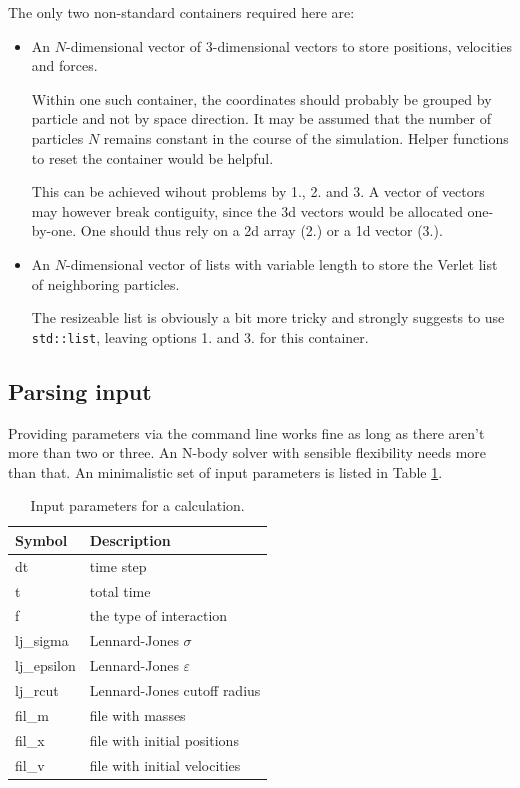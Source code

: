 \documentclass{scrartcl}
\begin{document}
The only two non-standard containers required here are:
\begin{itemize}
    \item An $N$-dimensional vector of $3$-dimensional vectors to 
        store positions, velocities and forces.

        Within one such container, the coordinates should probably be grouped
        by particle and not by space direction. 
        It may be assumed that the number of particles $N$ remains constant
        in the course of the simulation.
        Helper functions to reset the container would be helpful.

        This can be achieved wihout problems by 1., 2. and 3.
        A vector of vectors may however break contiguity,
        since the 3d vectors would be allocated one-by-one.
        One should thus rely on a 2d array (2.) or a 1d vector (3.).

    \item An $N$-dimensional vector of lists with variable length
        to store the Verlet list of neighboring particles.

        The resizeable list is obviously a bit more tricky and strongly
        suggests to use \verb|std::list|, leaving options 1. and 3. 
        for this container.
\end{itemize}

\subsection{Parsing input}

Providing parameters via the command line works fine as long as there aren't
more than two or three.
An N-body solver with sensible flexibility needs more than that.
An minimalistic set of input parameters is listed in Table \ref{tab:input}.

\begin{table}
    \centering
\begin{tabular}[h!]{ll}
    Symbol & Description \\\hline
    dt & time step \\
    t & total time \\
    f & the type of interaction\\
    lj\_sigma & Lennard-Jones $\sigma$ \\
    lj\_epsilon & Lennard-Jones $\varepsilon$\\
    lj\_rcut & Lennard-Jones cutoff radius\\
    fil\_m & file with masses \\
    fil\_x & file with initial positions\\
    fil\_v & file with initial velocities
\end{tabular}
    \caption{Input parameters for a calculation.}
    \label{tab:input}
\end{table}
\end{document}
